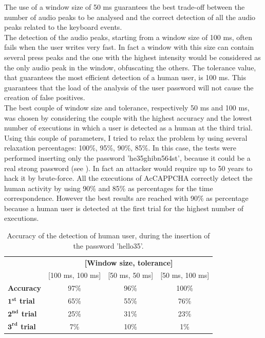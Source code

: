 The use of a window size of 50 ms guarantees the best trade-off between the number of audio peaks to be analysed and the correct detection of all the audio peaks related to the keyboard events.\\
The detection of the audio peaks, starting from a window size of 100 ms, often fails when the user writes very fast. In fact a window with this size can contain several press peaks and the one with the highest intensity would be considered as the only audio peak in the window, obfuscating the others. The tolerance value, that guarantees the most efficient detection of a human user, is 100 ms. This guarantees that the load of the analysis of the user password will not cause the creation of false positives.\\
The best couple of window size and tolerance, respectively 50 ms and 100 ms, was chosen by considering the couple with the highest accuracy and the lowest number of executions in which a user is detected as a human at the third trial. Using this couple of parameters, I tried to relax the problem by using several relaxation percentages: 100\%, 95\%, 90\%, 85\%. In this case, the tests were performed inserting only the password 'he35ghibn564st', because it could be a real strong password (see ). In fact an attacker would require up to 50 years to hack it by brute-force. All the executions of AcCAPPCHA correctly detect the human activity by using 90\% and 85\% as percentages for the time correspondence. However the best results are reached with 90\% as percentage because a human user is detected at the first trial for the highest number of executions.\\
\begin{table}[H]
\centering\footnotesize
\begin{tabular}{lccc}
\cline{2-4}
&\multicolumn{3}{c}{\textbf{[Window size, tolerance]}}\\
\cline{2-4}
&{[100 ms, 100 ms]}&{[50 ms, 50 ms]}&{[50 ms, 100 ms]}\\
\hline
{\textbf{Accuracy}}&{97\%}&{96\%}&{100\%}\\
\hline
{\textbf{$\mathbf{1^{st}}$ trial}}&{65\%}&{55\%}&{76\%}\\
\hline
{\textbf{$\mathbf{2^{nd}}$ trial}}&{25\%}&{31\%}&{23\%}\\
\hline
{\textbf{$\mathbf{3^{rd}}$ trial}}&{7\%}&{10\%}&{1\%}\\
\hline
\end{tabular}
\caption{\footnotesize{Accuracy of the detection of human user, during the insertion of the password 'hello35'.}}
\label{Results:hello35}
\end{table}
